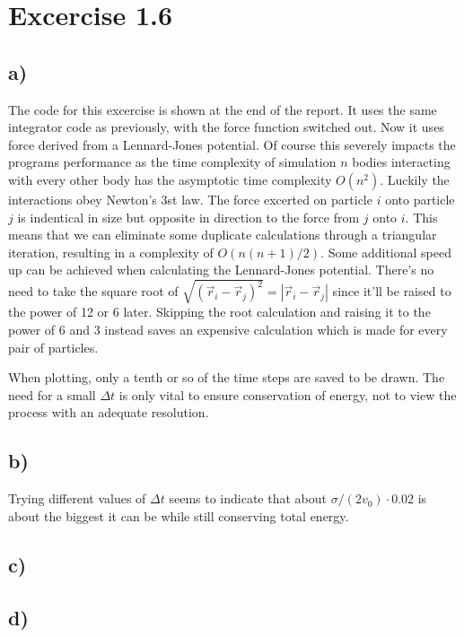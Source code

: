 \documentclass[a4paper, 12pt]{article}
\begin{document}
\section*{Excercise 1.6}

\subsection*{a)}
The code for this excercise is shown at the end of the report. It uses the same integrator code as previously, with the force function switched out. Now it uses force derived from a Lennard-Jones potential. Of course this severely impacts the programs performance as the time complexity of simulation $n$ bodies interacting with every other body has the asymptotic time complexity $O(n^2)$. Luckily the interactions obey Newton's 3st law. The force excerted on particle $i$ onto particle $j$ is indentical in size but opposite in direction to the force from $j$ onto $i$. This means that we can eliminate some duplicate calculations through a triangular iteration, resulting in a complexity of $O(n(n+1)/2)$. Some additional speed up can be achieved when calculating the Lennard-Jones potential. There's no need to take the square root of $\sqrt{(\vec{r}_i - \vec{r}_j)^2} = |\vec{r}_i - \vec{r}_j|$ since it'll be raised to the power of 12 or 6 later. Skipping the root calculation and raising it to the power of 6 and 3 instead saves an expensive calculation which is made for every pair of particles.

When plotting, only a tenth or so of the time steps are saved to be drawn. The need for a small $\Delta t$ is only vital to ensure conservation of energy, not to view the process with an adequate resolution.

\subsection*{b)}
Trying different values of $\Delta t$ seems to indicate that about $\sigma/(2v_0) \cdot 0.02$ is about the biggest it can be while still conserving total energy.

\subsection*{c)}
\subsection*{d)}
\end{document}
